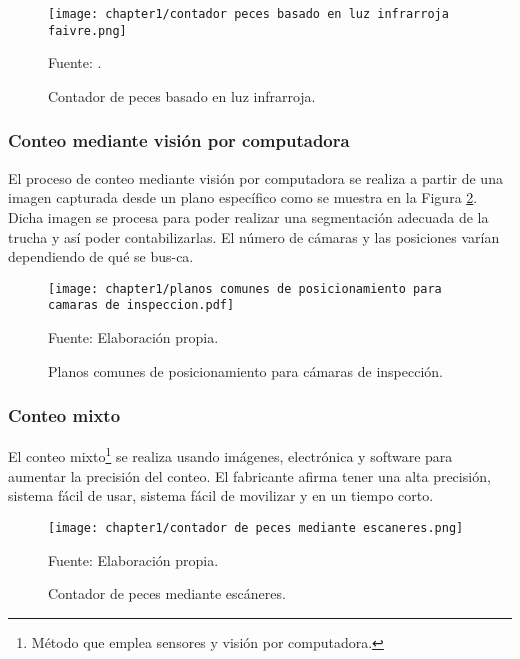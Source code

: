 \begin{figure}[H]
	\centering
	\texttt{[image: chapter1/contador peces basado en luz infrarroja faivre.png]}
	\caption{Contador de peces basado en luz infrarroja.}
	Fuente: \cite{FAIVRE2013}.
	\label{fig:contador peces basado en luz infrarroja faivre}
\end{figure}

\subsubsection{Conteo mediante visión por computadora}

El proceso de conteo mediante visión por computadora se realiza a partir de una imagen capturada desde un plano específico como se muestra en la  Figura \ref{fig:planos comunes de posicionamiento para camaras de inspeccion}. Dicha imagen se procesa para poder realizar una segmentación adecuada de la trucha y así poder contabilizarlas. El número de cámaras y las posiciones varían dependiendo de qué se bus-ca.

\begin{figure}[H]
	\centering
	\texttt{[image: chapter1/planos comunes de posicionamiento para camaras de inspeccion.pdf]}
	\caption{Planos comunes de posicionamiento para cámaras de inspección.}
	Fuente: Elaboración propia.
	\label{fig:planos comunes de posicionamiento para camaras de inspeccion}
\end{figure}

\subsubsection{Conteo mixto}

El conteo mixto\footnote{Método que emplea sensores y visión por computadora.} se realiza usando imágenes, electrónica y software para aumentar la precisión del conteo. El fabricante afirma tener una alta precisión, sistema fácil de usar, sistema fácil de movilizar y en un tiempo corto. \cite{AquaScan2015}

\begin{figure}[H]
	\centering
	\texttt{[image: chapter1/contador de peces mediante escaneres.png]}
	\caption{Contador de peces mediante escáneres.}
	Fuente: Elaboración propia.
	\label{fig:contador de peces mediante escaneres}
\end{figure}

